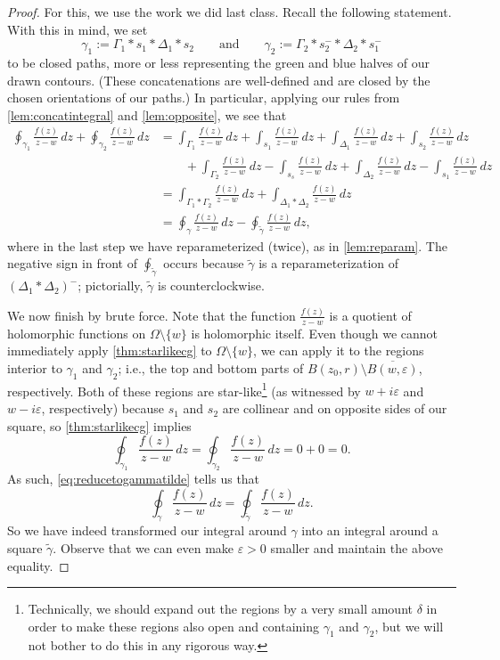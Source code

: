 \begin{proof}
	For this, we use the work we did last class. Recall the following statement.
	\starlikecg*
	\noindent With this in mind, we set
	\[\gamma_1:=\Gamma_1*s_1*\Delta_1*s_2\qquad\text{and}\qquad\gamma_2:=\Gamma_2*s_2^-*\Delta_2*s_1^-\]
	to be closed paths, more or less representing the green and blue halves of our drawn contours. (These concatenations are well-defined and are closed by the chosen orientations of our paths.) In particular, applying our rules from \autoref{lem:concatintegral} and \autoref{lem:opposite}, we see that
	\begin{align*}
		\oint_{\gamma_1}\frac{f(z)}{z-w}\,dz+\oint_{\gamma_2}\frac{f(z)}{z-w}\,dz &= \int_{\Gamma_1}\frac{f(z)}{z-w}\,dz+\int_{s_1}\frac{f(z)}{z-w}\,dz+\int_{\Delta_1}\frac{f(z)}{z-w}\,dz+\int_{s_2}\frac{f(z)}{z-w}\,dz \\
		&\qquad +\int_{\Gamma_2}\frac{f(z)}{z-w}\,dz-\int_{s_s}\frac{f(z)}{z-w}\,dz+\int_{\Delta_2}\frac{f(z)}{z-w}\,dz-\int_{s_1}\frac{f(z)}{z-w}\,dz \\
		&= \int_{\Gamma_1*\Gamma_2}\frac{f(z)}{z-w}\,dz+\int_{\Delta_1*\Delta_2}\frac{f(z)}{z-w}\,dz \\
		&= \oint_{\gamma}\frac{f(z)}{z-w}\,dz-\oint_{\widetilde\gamma}\frac{f(z)}{z-w}\,dz, \tag{1}\label{eq:reducetogammatilde}
	\end{align*}
	where in the last step we have reparameterized (twice), as in \autoref{lem:reparam}. The negative sign in front of $\oint_{\widetilde\gamma}$ occurs because $\widetilde\gamma$ is a reparameterization of $(\Delta_1*\Delta_2)^-$; pictorially, $\widetilde\gamma$ is counterclockwise.

	We now finish by brute force. Note that the function $\frac{f(z)}{z-w}$ is a quotient of holomorphic functions on $\Omega\setminus\{w\}$ is holomorphic itself. Even though we cannot immediately apply \autoref{thm:starlikecg} to $\Omega\setminus\{w\}$, we can apply it to the regions interior to $\gamma_1$ and $\gamma_2$; i.e., the top and bottom parts of $B(z_0,r)\setminus\overline{B(w,\varepsilon)}$, respectively. Both of these regions are star-like\footnote{Technically, we should expand out the regions by a very small amount $\delta$ in order to make these regions also open and containing $\gamma_1$ and $\gamma_2$, but we will not bother to do this in any rigorous way.} (as witnessed by $w+i\varepsilon$ and $w-i\varepsilon$, respectively) because $s_1$ and $s_2$ are collinear and on opposite sides of our square, so \autoref{thm:starlikecg} implies
	\[\oint_{\gamma_1}\frac{f(z)}{z-w}\,dz=\oint_{\gamma_2}\frac{f(z)}{z-w}\,dz=0+0=0.\]
	As such, \autoref{eq:reducetogammatilde} tells us that
	\[\oint_\gamma\frac{f(z)}{z-w}\,dz=\oint_{\widetilde\gamma}\frac{f(z)}{z-w}\,dz.\]
	So we have indeed transformed our integral around $\gamma$ into an integral around a square $\widetilde\gamma$. Observe that we can even make $\varepsilon>0$ smaller and maintain the above equality.


\end{proof}
